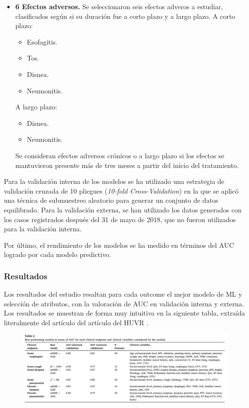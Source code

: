 \begin{itemize}
    \item \textbf{6 Efectos adversos.} Se seleccionaron seis efectos adveros a estudiar, clasificados según si su duración fue a corto plazo y a largo plazo. A corto plazo:
    \begin{itemize}[label={--}]
        \item Esofagitis.
        \item Tos.
        \item Disnea. 
        \item Neumonitis. 
    \end{itemize}
    A largo plazo:
    \begin{itemize}[label={--}]
        \item Disnea. 
        \item Neumonitis. 
    \end{itemize}
    Se consideran efectos adversos crónicos o a largo plazo si los efectos se mantuvieron presente más de tres meses a partir del inicio del tratamiento.
\end{itemize}

Para la validación interna de los modelos se ha utilizado una estrategia de validación cruzada de 10 pliegues (\textit{10-fold Cross-Validation}) en la que se aplicó una técnica de submuestreo aleatorio para generar un conjunto de datos equilibrado. Para la validación externa, se han utilizado los datos generados con los casos registrados después del 31 de mayo de 2018, que no fueron utilizados para la validación interna. 

Por último, el rendimiento de los modelos se ha medido en términos del AUC logrado por cada modelo predictivo.

\subsubsection{Resultados}

Los resultados del estudio resaltan para cada outcome el mejor modelo de ML y selección de atributos, con la valoración de AUC en validación interna y externa. Los resultados se muestran de forma muy intuitiva en la siguiente tabla, extraída literalmente del artículo del artículo del HUVR \cite{nunez2023benchmarking}.

\begin{figure}[H]
    \centering
    \includegraphics[width=1\textwidth]{tables/nune2023table2.png}
    \label{table:nune2023table2}
\end{figure}


